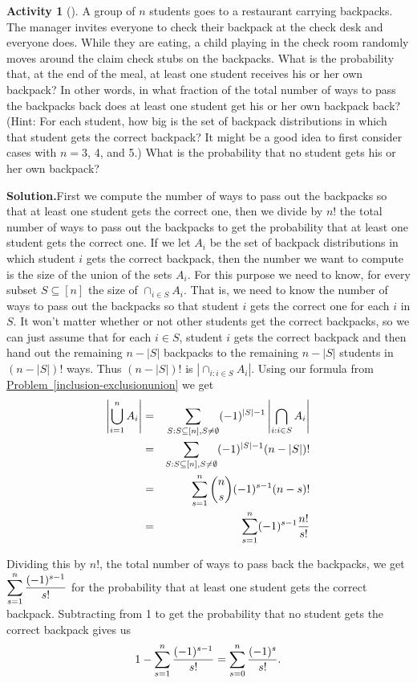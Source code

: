 \documentclass[10pt,]{book}
\theoremstyle{plain}
\theoremstyle{definition}
\newtheorem{activity}[project]{Activity}
\numberwithin{equation}{chapter}
\newcommand{\amp}{&}
\begin{document}
\begin{activity}[]\label{hatcheck}
A group of \(n\) students goes to a restaurant carrying backpacks. The manager invites everyone to check their backpack at the check desk and everyone does. While they are eating, a child playing in the check room randomly moves around the claim check stubs on the backpacks. What is the probability that, at the end of the meal, at least one student receives his or her own backpack? In other words, in what fraction of the total number of ways to pass the backpacks back does at least one student get his or her own backpack back? (Hint: For each student, how big is the set of backpack distributions in which that student gets the correct backpack? It might be a good idea to first consider cases with \(n=3\), 4, and 5.) What is the probability that no student gets his or her own backpack?%
\par\medskip\noindent%
\textbf{Solution.}\quad First we compute the number of ways to pass out the backpacks so that at least one student gets the correct one, then we divide by \(n!\) the total number of ways to pass out the backpacks to get the probability that at least one student gets the correct one. If we let \(A_i\) be the set of backpack distributions in which student \(i\) gets the correct backpack, then the number we want to compute is the size of the union of the sets \(A_i\). For this purpose we need to know, for every subset \(S\subseteq [n]\) the size of \(\cap_{i\in S}A_i\). That is, we need to know the number of ways to pass out the backpacks so that student \(i\) gets the correct one for each \(i\) in \(S\). It won't matter whether or not other students get the correct backpacks, so we can just assume that for each \(i\in S\), student \(i\) gets the correct backpack and then hand out the remaining \(n-|S|\) backpacks to the remaining \(n-|S|\) students in \((n-|S|)!\) ways. Thus \((n-|S|)!\) is \(|\cap_{i:i\in S}A_i|\). Using our formula from \hyperref[inclusion-exclusionunion]{Problem~\ref{inclusion-exclusionunion}} we get%
\begin{align*}
\left|\bigcup_{i=1}^n A_i \right| \amp =\amp  \sum_{S:
S\subseteq [n], S\not=\emptyset}
(-1)^{|S|-1}\left|\bigcap_{i:i\in S} A_i \right|\\
\amp =\amp \sum_{S:
S\subseteq [n], S\not=\emptyset}(-1)^{|S|-1} (n-|S|)!\\
\amp =\amp
\sum_{s=1}^n {n\choose
s}(-1)^{s-1}(n-s)!\\
\amp =\amp \sum_{s=1}^n
(-1)^{s-1}{n!\over s!}
\end{align*}
%
\par
Dividing this by \(n!\), the total number of ways to pass back the backpacks, we get \(\displaystyle \sum_{s=1}^n {(-1)^{s-1}\over s!}\) for the probability that at least one student gets the correct backpack. Subtracting from 1 to get the probability that no student gets the correct backpack gives us%
\begin{equation*}
1- \sum_{s=1}^n {(-1)^{s-1}\over
s!}=\sum_{s=0}^n{(-1)^s\over s!}.
\end{equation*}
%
\end{activity}
\end{document}
